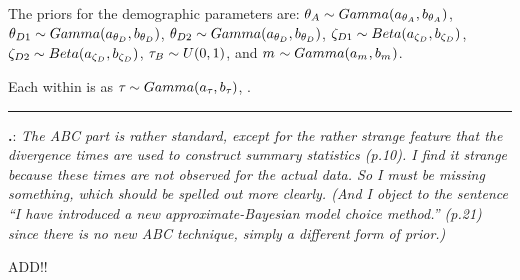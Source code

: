 \documentclass[12pt]{article}
\newcounter{commentCounter}
\newcommand{\revcomment}[1]{{\addtocounter{commentCounter}{1}}
    \medskip \hrule \noindent
\textbf{\arabic{section}.\arabic{commentCounter}}: {\sl #1}\par\xspace}
\newcommand{\response}[1]{{\addtolength{\leftskip}{0.25in} #1\par}\xspace}
\let\quoteOld\quote
\let\endquoteOld\endquote
\renewenvironment{quote}{\sffamily\small\quoteOld}{\endquoteOld}
\begin{document}
{    \begin{quote}
        The priors for the demographic parameters are:
        $\ancestralTheta{} \sim Gamma(\gammaShape{\ancestralTheta{}},
        \gammaScale{\ancestralTheta{}})$,
        $\descendantTheta{1}{} \sim Gamma(\gammaShape{\descendantTheta{}{}},
        \gammaScale{\descendantTheta{}{}})$,
        $\descendantTheta{2}{} \sim Gamma(\gammaShape{\descendantTheta{}{}},
        \gammaScale{\descendantTheta{}{}})$,
        $\bottleScalar{1}{} \sim Beta(\betaA{\bottleScalar{}{}},
        \betaB{\bottleScalar{}{}})$,
        $\bottleScalar{2}{} \sim Beta(\betaA{\bottleScalar{}{}},
        \betaB{\bottleScalar{}{}})$,
        $\bottleTime{} \sim U(0, 1)$,
        and
        $m_{} \sim Gamma(a_{m_{}},
        b_{m_{}})$.
    \end{quote}

    \begin{quote}
        Each \divTime{} within \divTimeVector is \iid as $\tau_{} \sim
        Gamma(a_{\tau_{}}, b_{\tau_{}})$, .
    \end{quote}
}

\revcomment{
    The ABC part is rather standard, except for the rather strange feature that
    the divergence times are used to construct summary statistics (p.10). I
    find it strange because these times are not observed for the actual data.
    So I must be missing something, which should be spelled out more clearly.
    (And I object to the sentence ``I have introduced a new approximate-Bayesian
    model choice method.'' (p.21) since there is no new ABC technique, simply a
    different form of prior.)
}
\response{
    ADD!!
}
\end{document}
